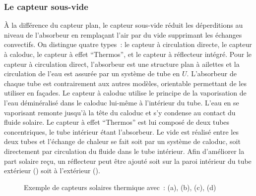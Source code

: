 \subsubsection{Le capteur sous-vide} %
\label{ssub:le_capteur_sous_vide}
À la différence du capteur plan, le capteur sous-vide réduit les déperditions
au niveau de l’absorbeur en remplaçant l’air par du vide supprimant les échanges
convectifs. On distingue quatre types~: le capteur à circulation directe,
le capteur à caloduc, le capteur à effet \enquote{Thermos}, et le capteur à
réflecteur intégré. Pour le capteur à circulation direct, l’absorbeur est une structure
plan à ailettes et la circulation de l’eau est assurée par un système de tube en $U$.
L’absorbeur de chaque tube est contrairement aux autres modèles, orientable permettant
de les utiliser en façades. Le capteur à caloduc utilise le principe de la vaporisation
de l’eau déminéralisé dans le caloduc lui-même à l’intérieur du tube. L’eau en se vaporisant
remonte jusqu’à la tête du caloduc et s’y condense au contact du fluide solaire.
Le capteur à effet \enquote{Thermos} est lui composé de deux tubes concentriques,
le tube intérieur étant l’absorbeur. Le vide est réalisé entre les deux tubes et
l’échange de chaleur se fait soit par un système de caloduc, soit directement par
circulation du fluide dans le tube intérieur. Afin d’améliorer la part solaire reçu,
un réflecteur peut être ajouté soit sur la paroi intérieur du tube extérieur ()
soit à l’extérieur ().

\begin{figure}
    \centering
    \caption{Exemple de capteurs solaires thermique avec~: (a), (b), (c), (d)}
    \label{fig:image_panneaux_solaires}
\end{figure}


